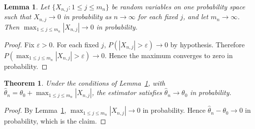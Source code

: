 \documentclass{article}
\newtheorem{lemma}{Lemma}
\newtheorem{theorem}{Theorem}
\begin{document}
\begin{lemma}\label{lem:growing-max}
Let $\{X_{n,j} : 1 \le j \le m_n\}$ be random variables on one probability
space such that $X_{n,j} \to 0$ in probability as $n \to \infty$ for each
fixed $j$, and let $m_n \to \infty$. Then
$\max_{1 \le j \le m_n} |X_{n,j}| \to 0$ in probability.
\end{lemma}

\begin{proof}
Fix $\varepsilon > 0$.
For each fixed $j$, $P(|X_{n,j}| > \varepsilon) \to 0$ by hypothesis.
Therefore $P(\max_{1 \le j \le m_n} |X_{n,j}| > \varepsilon) \to 0$.
Hence the maximum converges to zero in probability.
\end{proof}

\begin{theorem}\label{thm:main}
Under the conditions of Lemma~\ref{lem:growing-max}, with
$\hat\theta_n = \theta_0 + \max_{1 \le j \le m_n} |X_{n,j}|$,
the estimator satisfies $\hat\theta_n \to \theta_0$ in probability.
\end{theorem}

\begin{proof}
By Lemma~\ref{lem:growing-max},
$\max_{1 \le j \le m_n} |X_{n,j}| \to 0$ in probability.
Hence $\hat\theta_n - \theta_0 \to 0$ in probability, which is the claim.
\end{proof}
\end{document}
